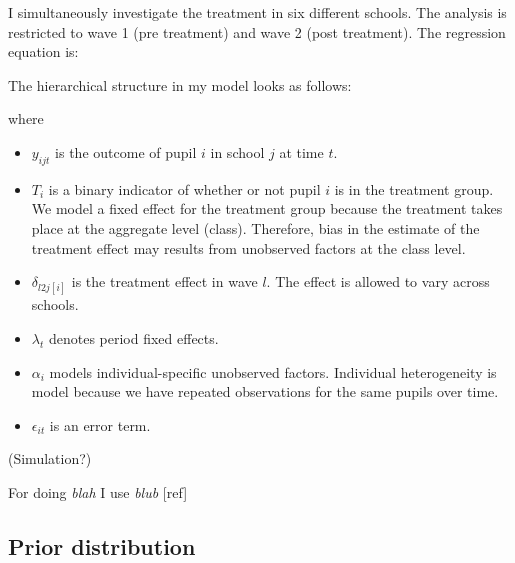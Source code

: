 \documentclass[a4, 12pt]{article}
\providecommand{\tightlist}{%
  \setlength{\itemsep}{0pt}\setlength{\parskip}{0pt}}
\begin{document}
I simultaneously investigate the treatment in six different schools. The analysis is restricted to wave 1 (pre treatment) and wave 2 (post treatment). The regression equation is:

The hierarchical structure in my model looks as follows:

where

\begin{itemize}
\tightlist
\item
  \(y_{ijt}\) is the outcome of pupil \(i\) in school \(j\) at time \(t\).
\item
  \(T_{i}\) is a binary indicator of whether or not pupil \(i\) is in the treatment group. We model a fixed effect for the treatment group because the treatment takes place at the aggregate level (class). Therefore, bias in the estimate of the treatment effect may results from unobserved factors at the class level.
\item
  \(\delta_{l2j[i]}\) is the treatment effect in wave \(l\). The effect is allowed to vary across schools.
\item
  \(\lambda_t\) denotes period fixed effects.
\item
  \(\alpha_{i}\) models individual-specific unobserved factors. Individual heterogeneity is model because we have repeated observations for the same pupils over time.
\item
  \(\epsilon_{it}\) is an error term.
\end{itemize}

(Simulation?)

For doing \emph{blah} I use \emph{blub} {[}ref{]}

\hypertarget{prior-distribution}{%
\subsection{Prior distribution}\label{prior-distribution}}
\end{document}
